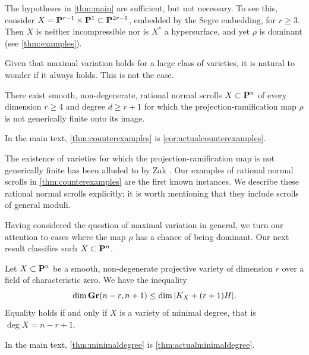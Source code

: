 \documentclass[11pt,reqno]{amsart}
\theoremstyle{plain}
\theoremstyle{definition}
\theoremstyle{remark}
\numberwithin{equation}{section}
\numberwithin{equation}{section}
\begin{document}
The hypotheses in \autoref{thm:main} are sufficient, but not necessary.
To see this, consider $X = \P^{r-1} \times \P^1 \subset \P^{2r-1}$, embedded by the Segre embedding, for $r \geq 3$.
Then $X$ is neither incompressible nor is $X^*$ a hypersurface, and yet $\rho$ is dominant (see \autoref{thm:examples}).

Given that maximal variation holds for a large class of varieties, it is natural to wonder if it always holds.
This is not the case.
\begin{maintheorem}
  \label{thm:counterexamples}
  There exist smooth, non-degenerate, rational normal scrolls $X \subset \P^{n}$ of every dimension $r \geq 4$ and degree $d \geq r+1$ for which the projection-ramification map $\rho$ is not generically finite onto its image.
\end{maintheorem}
In the main text, \autoref{thm:counterexamples} is \autoref{cor:actualcounterexamples}.

The existence of varieties for which the projection-ramification map is not generically finite has been alluded to by Zak \cite{zak:}. Our examples of rational normal scrolls in \autoref{thm:counterexamples} are the first known instances.
We describe these rational normal scrolls  explicitly; it is worth mentioning that they include scrolls of general moduli.

Having considered the question of maximal variation in general, we turn our attention to cases where the map $\rho$ has a chance of being dominant.
Our next result classifies such $X \subset \P^n$.
\begin{maintheorem}\label{thm:minimaldegree}
  Let $X \subset \P^{n}$ be a smooth, non-degenerate projective variety of dimension $r$ over a field of characteristic zero.
  We have the inequality
  \[ \dim \Gr(n-r, n+1) \leq \dim |K_X + (r+1)H|.\]
  Equality holds if and only if $X$ is a variety of minimal degree, that is $\deg X = n-r+1$.
\end{maintheorem}
In the main text, \autoref{thm:minimaldegree} is \autoref{thm:actualminimaldegree}.
\end{document}
